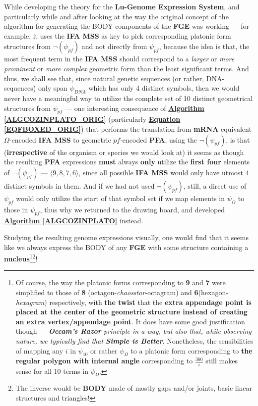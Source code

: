 \documentclass[a4paper, 18pt]{book} %
\begin{document}
\begin{appendices}
While developing the theory for the \textbf{Lu-Genome Expression System}, and particularly while and after looking at the way the original concept of the algorithm for generating the BODY-components of the \textbf{FGE} was working --- for example, it uses the \textbf{IFA MSS} as key to pick corresponding platonic form structures from $\lnot(\psi_{pf})$ and not directly from $\psi_{pf}$, because the idea is that, the most frequent term in the \textbf{IFA MSS} should correspond to a \textit{larger} or \textit{more prominent} or \textit{more complex} geometric form than the least significant terms. And thus, we shall see that, since natural genetic sequences (or rather, DNA-sequences) only span $\psi_{DNA}$ which has only 4 distinct symbols, then we would never have a meaningful way to utilize the complete set of 10 distinct geometrical structures from $\psi_{pf}$ --- one interesting consequence of \textbf{\hyperref[ALGCOZINPLATO_ORIG]{Algorithm \ref{ALGCOZINPLATO_ORIG}}} (particularly \textbf{\hyperref[EQFBOXED_ORIG]{Equation \ref{EQFBOXED_ORIG}}}) that performs the translation from \textbf{mRNA}-equivalent $\Omega$-encoded \textbf{IFA MSS} to geometric $pf$-encoded \textbf{PFA}, using the $\lnot(\psi_{pf})$, is that (\textbf{irrespective} of the organism or species we would look at) it seems as though the resulting \textbf{PFA} expressions \textbf{must} always \textbf{only} utilize the \textbf{first four} elements of $\lnot(\psi_{pf})$ --- $\langle 9, 8, 7, 6 \rangle$, since all possible \textbf{IFA MSS} would only have utmost $4$ distinct symbols in them. And if we had not used $\lnot(\psi_{pf})$, still, a direct use of $\psi_{pf}$ would only utilize the start of that symbol set if we map elements in $\psi_\Omega$ to those in $\psi_{pf}$, thus why we returned to the drawing board, and developed \textbf{\hyperref[ALGCOZINPLATO]{Algorithm \ref{ALGCOZINPLATO}}} instead.

Studying the resulting genome expressions visually, one would find that it seems like we always express the BODY of any \textbf{FGE} with some structure containing a \textbf{nucleus}\footnote{Of course, the way the platonic forms corresponding to \textbf{9} and \textbf{7} were simplified to those of \textbf{8} (octagon-\textit{chaosstar}-octagram) and \textbf{6}(hexagon-\textit{hexagram}) respectively, with \textbf{the twist} that the \textbf{extra appendage point is placed at the center of the geometric structure instead of creating an extra vertex/appendage point}. It does have some good justification though --- \textit{\textbf{Occam's Razor} principle in a way, but also that, while observing nature, we typically find that \textbf{Simple is Better}}. Nonetheless, the sensibilities of mapping any $i$ in $\psi_{10}$ or rather $\psi_\Omega$ to a platonic form corresponding to \textbf{the regular polygon with internal angle} corresponding to $\frac{360}{i}$ still makes sense for all 10 terms in $\psi_\Omega$.}\footnote{The inverse would be \textbf{BODY} made of mostly gaps and/or joints, basic linear structures and triangles!}!


\end{appendices}
\end{document}
